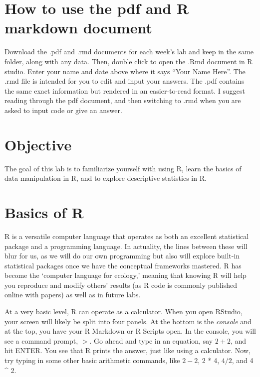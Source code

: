 \documentclass[]{article}
\begin{document}
\hypertarget{how-to-use-the-pdf-and-r-markdown-document}{%
\section{How to use the pdf and R markdown
document}\label{how-to-use-the-pdf-and-r-markdown-document}}

Download the .pdf and .rmd documents for each week's lab and keep in the
same folder, along with any data. Then, double click to open the .Rmd
document in R studio. Enter your name and date above where it says
``Your Name Here''. The .rmd file is intended for you to edit and input
your answers. The .pdf contains the same exact information but rendered
in an easier-to-read format. I suggest reading through the pdf document,
and then switching to .rmd when you are asked to input code or give an
answer.

\hypertarget{objective}{%
\section{Objective}\label{objective}}

The goal of this lab is to familiarize yourself with using R, learn the
basics of data manipulation in R, and to explore descriptive statistics
in R.

\hypertarget{basics-of-r}{%
\section{Basics of R}\label{basics-of-r}}

R is a versatile computer language that operates as both an excellent
statistical package and a programming language. In actuality, the lines
between these will blur for us, as we will do our own programming but
also will explore built-in statistical packages once we have the
conceptual frameworks mastered. R has become the `computer language for
ecology,' meaning that knowing R will help you reproduce and modify
others' results (as R code is commonly published online with papers) as
well as in future labs.

At a very basic level, R can operate as a calculator. When you open
RStudio, your screen will likely be split into four panels. At the
bottom is the \emph{console} and at the top, you have your R Markdown or
R Scripts open. In the console, you will see a command prompt, \(>\). Go
ahead and type in an equation, say \(2 + 2\), and hit ENTER. You see
that R prints the answer, just like using a calculator. Now, try typing
in some other basic arithmetic commands, like \(2 - 2\), 2 * 4, \(4/2\),
and 4 \^{} 2.
\end{document}
